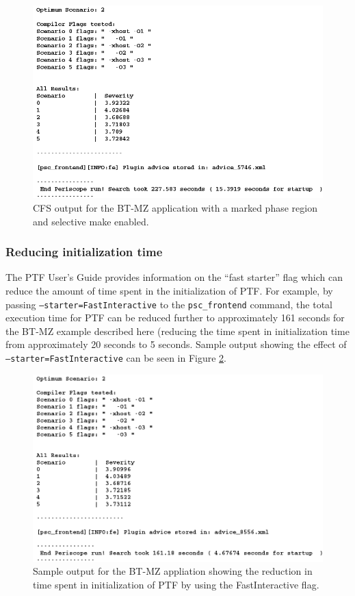 \begin{figure}[H]
	\includegraphics[width=\textwidth]{../BPG/images/uc1_user_regions.png}
	\caption{CFS output for the BT-MZ application with a marked phase region and selective make enabled.}
	\label{fig:uc1_user_regions}
\end{figure}

\subsubsection{Reducing initialization time}
The PTF User's Guide provides information on the ``fast starter'' flag which can reduce the amount of time spent in the initialization of PTF. For example, by passing {\tt --starter=FastInteractive} to the {\tt psc\_frontend} command,  the total execution time for PTF can be reduced further to approximately 161 seconds for the BT-MZ example described here (reducing the time spent in initialization time from approximately 20 seconds to 5 seconds. Sample output showing the effect of {\tt --starter=FastInteractive} can be seen in Figure \ref{fig:uc1_fast_interactive}.

\begin{figure}[H]
	\includegraphics[width=\textwidth]{../BPG/images/uc1_fast_interactive.png}
	\caption{Sample output for the BT-MZ appliation showing the reduction in time spent in initialization of PTF by using the FastInteractive flag.}
	\label{fig:uc1_fast_interactive}
\end{figure}

